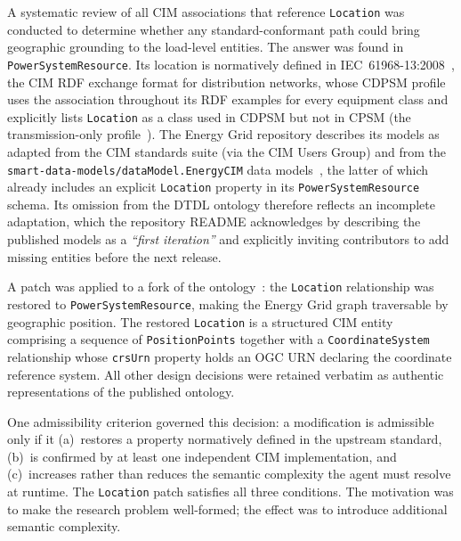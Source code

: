 A systematic review of all CIM associations that reference \texttt{Location}
    was conducted to determine whether any standard-conformant path could
    bring geographic grounding to the load-level entities.
The answer was found in \texttt{PowerSystemResource}.
Its location is normatively defined in
    IEC~61968-13:2008~\cite{internationalelectrotechnicalcommissionApplicationIntegrationElectric2008},
    the CIM RDF exchange format for distribution networks,
    whose CDPSM profile uses the association throughout its RDF examples
    for every equipment class and explicitly lists \texttt{Location} as a class used in CDPSM
    but not in CPSM (the transmission-only profile~\cite{Uslar_2012}).
The Energy Grid repository describes its models as adapted from
    the CIM standards suite (via the CIM Users Group) and from the
    \texttt{smart-data-models/dataModel.EnergyCIM} data models~\cite{abellaSmartdatamodelsDataModelEnergyCIM2024},
    the latter of which already includes an explicit \texttt{Location} property in its
    \texttt{PowerSystemResource} schema.
Its omission from the DTDL ontology therefore reflects an incomplete adaptation,
    which the repository README acknowledges by describing the published models as
    a \textit{``first iteration''} and explicitly inviting contributors to
    add missing entities before the next release.

A patch was applied to a fork of the ontology~\cite{correaHenriKCorreaOpendigitaltwinsenergygrid2026}:
    the \texttt{Location} relationship was restored to \texttt{PowerSystemResource},
    making the Energy Grid graph traversable by geographic position.
The restored \texttt{Location} is a structured CIM entity comprising
    a sequence of \texttt{PositionPoints} together with a \texttt{CoordinateSystem} relationship
    whose \texttt{crsUrn} property holds an OGC URN declaring the coordinate reference system.
All other design decisions were retained verbatim as
    authentic representations of the published ontology.

One admissibility criterion governed this decision:
    a modification is admissible only if it
    (a)~restores a property normatively defined in the upstream standard,
    (b)~is confirmed by at least one independent CIM implementation, and
    (c)~increases rather than reduces the semantic complexity the agent must resolve at runtime.
The \texttt{Location} patch satisfies all three conditions.
The motivation was to make the research problem well-formed;
    the effect was to introduce additional semantic complexity.

